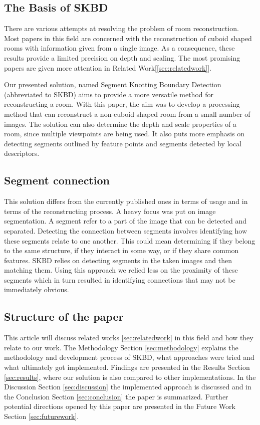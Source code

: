 \subsection{The Basis of SKBD} %
There are various attempts at resolving the problem of room reconstruction. Most papers in this field are concerned with the reconstruction of cuboid shaped rooms with information given from a single image. As a consequence, these results provide a limited precision on depth and scaling. The most promising papers are given more attention in Related Work[\ref{sec:relatedwork}].

Our presented solution, named Segment Knotting Boundary Detection (abbreviated to SKBD) aims to provide a more versatile method for reconstructing a room. With this paper, the aim was to develop a processing method that can reconstruct a non-cuboid shaped room from a small number of images. The solution can also determine the depth and scale properties of a room, since multiple viewpoints are being used. It also puts more emphasis on detecting segments outlined by feature points and segments detected by local descriptors. 

\subsection{Segment connection} %
This solution differs from the currently published ones in terms of usage and in terms of the reconstructing process. A heavy focus was put on image segmentation. A segment refer to a part of the image that can be detected and separated. Detecting the connection between segments involves identifying how these segments relate to one another. This could mean determining if they belong to the same structure, if they interact in some way, or if they share common features. SKBD relies on detecting segments in the taken images and then matching them. Using this approach we relied less on the proximity of these segments which in turn resulted in identifying connections that may not be immediately obvious.

\subsection{Structure of the paper}
This article will discuss related works \ref{sec:relatedwork} in this field and how they relate to our work.  The Methodology Section \ref{sec:methodology} explains the methodology and development process of SKBD, what approaches were tried and what ultimately got implemented.
    Findings are presented in the Results Section \ref{sec:results}, where our solution is also compared to other implementations. In the Discussion Section \ref{sec:discussion} the implemented approach is discussed and in the Conclusion Section \ref{sec:conclusion} the paper is summarized. Further potential directions opened by this paper are presented in the Future Work Section \ref{sec:futurework}.
